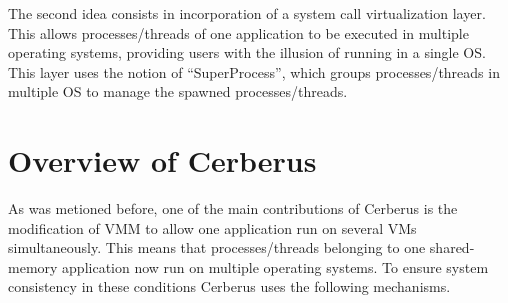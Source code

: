 \documentclass[journal]{IEEEtran}
\begin{document}
The second idea consists in incorporation of a system call
virtualization layer. This allows processes/threads of one application
to be executed in multiple operating systems, providing users with the
illusion of running in a single OS. This layer uses the notion of
``SuperProcess'', which groups processes/threads in multiple OS to
manage the spawned processes/threads.

\section{Overview of Cerberus}

As was metioned before, one of the main contributions of Cerberus is the
modification of VMM to allow one application run on several VMs
simultaneously. This means that processes/threads belonging to one
shared-memory application now run on multiple operating systems. To
ensure system consistency in these conditions Cerberus uses the
following mechanisms.
\end{document}
